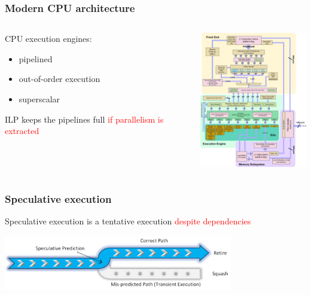 \begin{frame}[containsverbatim]
\frametitle{Modern CPU architecture}
\begin{columns}[c]
	\begin{column}{5cm}
	CPU execution engines:
	\begin{itemize}
		\item pipelined
		\item out-of-order execution
		\item superscalar
	\end{itemize}
	ILP keeps the pipelines full \textcolor{red}{if parallelism is extracted}
	\end{column} 
	\begin{column}{5cm}
	\includegraphics[width=5cm]{DayGilles/images/skylake.jpg}
	\end{column}
\end{columns} 
\end{frame}


\begin{frame}[containsverbatim]
\frametitle{Speculative execution }
Speculative execution is a tentative execution \textcolor{red}{despite dependencies}
\vfill
\begin{center}
\includegraphics[width=10cm]{DayGilles/images/speculative.png}
\end{center}
\end{frame}


